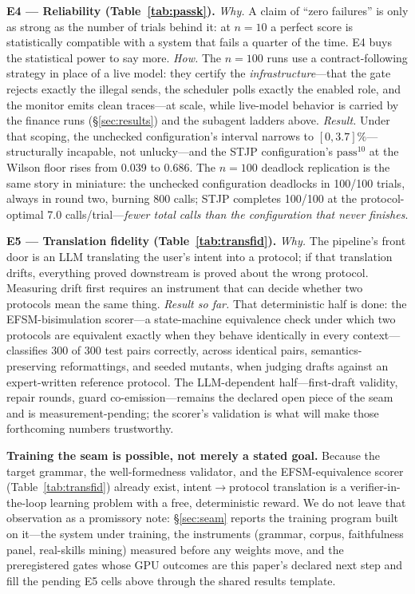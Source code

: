\documentclass{article}
\newcommand{\stjp}{\textsc{STJP}}
\begin{document}
\textbf{E4 --- Reliability (Table~\ref{tab:passk}).} \emph{Why.} A claim of ``zero failures'' is only as strong as the number of trials behind it: at $n{=}10$ a perfect score is statistically compatible with a system that fails a quarter of the time. E4 buys the statistical power to say more. \emph{How.} The $n{=}100$ runs use a contract-following strategy in place of a live model: they certify the \emph{infrastructure}---that the gate rejects exactly the illegal sends, the scheduler polls exactly the enabled role, and the monitor emits clean traces---at scale, while live-model behavior is carried by the finance runs (\S\ref{sec:results}) and the subagent ladders above. \emph{Result.} Under that scoping, the unchecked configuration's interval narrows to $[0, 3.7]\%$---structurally incapable, not unlucky---and the \stjp{} configuration's $\mathrm{pass}^{10}$ at the Wilson floor rises from 0.039 to 0.686. The $n{=}100$ deadlock replication is the same story in miniature: the unchecked configuration deadlocks in 100/100 trials, always in round two, burning 800 calls; \stjp{} completes 100/100 at the protocol-optimal 7.0 calls/trial---\emph{fewer total calls than the configuration that never finishes}.

\textbf{E5 --- Translation fidelity (Table~\ref{tab:transfid}).} \emph{Why.} The pipeline's front door is an LLM translating the user's intent into a protocol; if that translation drifts, everything proved downstream is proved about the wrong protocol. Measuring drift first requires an instrument that can decide whether two protocols mean the same thing. \emph{Result so far.} That deterministic half is done: the EFSM-bisimulation scorer---a state-machine equivalence check under which two protocols are equivalent exactly when they behave identically in every context---classifies 300 of 300 test pairs correctly, across identical pairs, semantics-preserving reformattings, and seeded mutants, when judging drafts against an expert-written reference protocol. The LLM-dependent half---first-draft validity, repair rounds, guard co-emission---remains the declared open piece of the seam and is measurement-pending; the scorer's validation is what will make those forthcoming numbers trustworthy.

\textbf{Training the seam is possible, not merely a stated goal.} Because the target grammar, the well-formedness validator, and the EFSM-equivalence scorer (Table~\ref{tab:transfid}) already exist, intent$\to$protocol translation is a verifier-in-the-loop learning problem with a free, deterministic reward. We do not leave that observation as a promissory note: \S\ref{sec:seam} reports the training program built on it---the system under training, the instruments (grammar, corpus, faithfulness panel, real-skills mining) measured before any weights move, and the preregistered gates whose GPU outcomes are this paper's declared next step and fill the pending E5 cells above through the shared results template.
\end{document}
